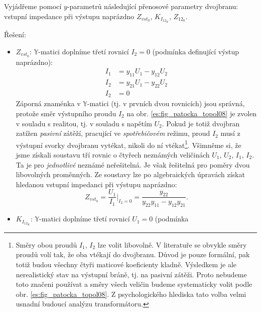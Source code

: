 \begin{example}\label{TEO:exam016}
  Vyjádřeme pomocí \(y\)-parametrů následující přenosové parametry dvojbranu: vstupní impedance při 
  výstupu naprázdno \(Z_{vst_0}\), \(K_{I_{12_K}}\), \(Z_{12_0}\). 
  
  Řešení:
  \begin{itemize}\addtolength{\itemsep}{-0.5\baselineskip}
    \item \(Z_{vst_0}\): \(\mathbb{Y}\)-matici doplníme třetí rovnicí \(I_2=0\) (podmínka 
    definující výstup naprázdno):
    \begin{subequations}\label{ES:eq_topol10}
      \begin{align}
        I_1 &= y_{11}U_1 - y_{12}U_2  \\
        I_2 &= y_{21}U_1 - y_{22}U_2  \\
        I_2 &= 0
      \end{align}
    \end{subequations}
    Záporná znaménka v \(\mathbb{Y}\)-matici (tj. v prvních dvou rovnicích) jsou správná, protože 
    směr výstupního proudu \(I_2\) na obr. \ref{es:fig_patocka_topol08} je zvolen v souladu s 
    realitou, tj. v souladu s napětím \(U_2\). Pokud je totiž dvojbran zatížen \emph{pasivní} 
    zátěží, pracující ve \emph{spotřebičovém} režimu, proud \(I_2\) musí z výstupní svorky 
    dvojbranu vytékat, nikoli do ní vtékat\footnote{Směry obou proudů \(I_1\), \(I_2\) lze volit 
    libovolně. V literatuře se obvykle směry proudů volí tak, že oba vtékají do dvojbranu. Důvod je 
    pouze formální, pak totiž budou všechny čtyři maticové koeficienty kladně. Výsledkem je ale 
    nerealistický stav na výstupní bráně, tj. na pasivní zátěži. Proto nebudeme toto značeni 
    používat a směry všech veličin budeme systematicky volit podle obr. 
    \ref{es:fig_patocka_topol08}. Z psychologického hlediska tato volba velmi usnadní budoucí 
    analýzu transformátoru.}. Všimněme si, že jsme získali soustavu tří rovnic o čtyřech neznámých 
    veličinách \(U_1\), \(U_2\), \(I_1\), \(I_2\). Ta je pro \emph{jednotlivé} neznámé neřešitelná. 
    Je však řešitelná pro poměry dvou libovolných proměnných. Ze soustavy lze po algebraických 
    úpravách získat hledanou vstupní impedanci při výstupu naprázdno:
    \begin{equation}\label{ES:eq_topol11}
    Z_{vst_0} = \frac{U_1}{I_1}\Bigg|_{I_2=0} 
    = \frac{y_{22}}{y_{22}y_{11} - y_{12}y_{21}}.
    \end{equation}
    \item \(K_{I_{12_K}}\): \(\mathbb{Y}\)-matici doplníme třetí rovnicí \(U_1 = 0\) (podmínka 

\end{itemize}
\end{example}
